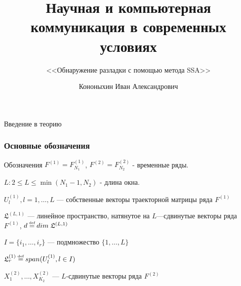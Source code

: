 \documentclass[11pt]{beamer}
\newcommand\eqdef{\mathrel{\stackrel{\makebox[0pt]{\mbox{\normalfont\tiny def}}}{=}}}
\begin{document}
	\author{Кононыхин Иван Александрович}
	
	\title[]{Научная и компьютерная коммуникация в современных условиях}
	\subtitle{<<Обнаружение разладки с помощью метода SSA>>}
	\date{\number\year}
	\begin{frame}[plain]
		\maketitle 
	\end{frame}
	
	\begin{frame}
		\centering
		Введение в теорию
	\end{frame}
	
	\begin{frame}
		\frametitle{Основные обозначения}
		\begin{block}{Обозначения}
			$F^{(1)} = F_{N_1}^{(1)}$, $F^{(2)} = F_{N_2}^{(2)}$ - временные ряды.
			
			$L: 2 \leq L \leq \min(N_1 - 1, N_2)$ - длина окна.
			
			$ U_l^{(1)}, l = 1, \dotsc, L $ --- собственные векторы траекторной матрицы ряда $ F^{(1)} $
			
			$\mathfrak{L}^{(L, 1)}$ --- линейное пространство, натянутое на $L$---сдвинутые векторы ряда $F^{(1)}$, $ d \eqdef dim \; \mathfrak{L}^{(L, 1)} $
			
			$ I = \{i_1, \dotsc, i_r\} $ --- подмножество $ \{1, \dotsc, L\} $
			
			$ \mathfrak{L}_r^{(1)} \eqdef span(U_l^{(1)}, l \in I) $
			
			$ X_1^{(2)}, \dotsc, X_{K_2}^{(2)} $ --- $L$-сдвинутые векторы ряда $F^{(2)} $
		\end{block}
	\end{frame}
	
\end{document}

